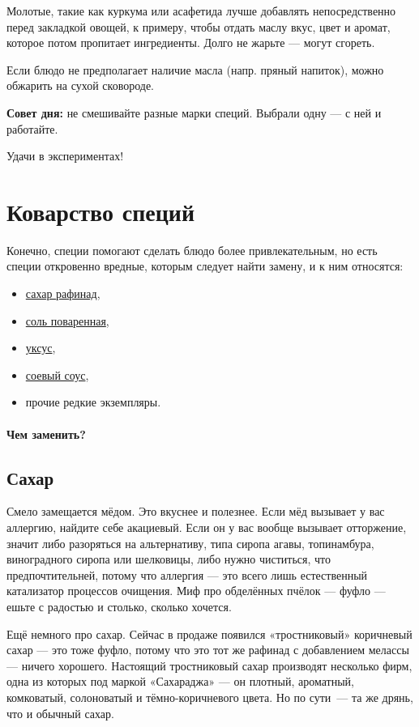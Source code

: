 Молотые, такие как куркума или асафетида лучше добавлять непосредственно перед закладкой овощей, к примеру, чтобы отдать маслу вкус, цвет и аромат, которое потом пропитает ингредиенты. Долго не жарьте — могут сгореть.

Если блюдо не предполагает наличие масла (напр. пряный напиток), можно обжарить на сухой сковороде.

\textbf{Совет дня:} не смешивайте разные марки специй. Выбрали одну — с ней и работайте.

Удачи в экспериментах!


\section{Коварство специй}\label{sec:replace}

Конечно, специи помогают сделать блюдо более привлекательным, но есть специи откровенно вредные, которым следует найти замену, и к ним относятся:
\begin{itemize}
    \item \hyperref[sugar]{сахар рафинад},
    \item \hyperref[salt]{соль поваренная},
    \item \hyperref[vinegar]{уксус},
\item \hyperref[soy]{соевый соус},
\item прочие редкие экземпляры.
\end{itemize}

\paragraph{Чем заменить?}

\subsection{Сахар}\label{sugar}

Смело замещается мёдом. Это вкуснее и полезнее.
Если мёд вызывает у вас аллергию, найдите себе акациевый. Если он у вас вообще вызывает отторжение, значит либо разоряться на альтернативу, типа сиропа агавы, топинамбура, виноградного сиропа или шелковицы, либо нужно чиститься, что предпочтительней, потому что аллергия — это всего лишь естественный катализатор процессов очищения. Миф про обделённых пчёлок — фуфло — ешьте с радостью и столько, сколько хочется.

Ещё немного про сахар. Сейчас в продаже появился «тростниковый» коричневый сахар — это тоже фуфло, потому что это тот же рафинад с добавлением мелассы — ничего хорошего. Настоящий тростниковый сахар производят несколько фирм, одна из которых под маркой «Сахараджа» — он плотный, ароматный, комковатый, солоноватый и тёмно-коричневого цвета. Но по сути~— та же дрянь, что и обычный сахар.

